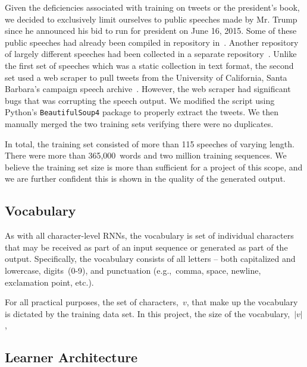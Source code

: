 \documentclass{article}
\begin{document}
Given the deficiencies associated with training on tweets or the president's book, we decided to exclusively limit ourselves to public speeches made by Mr. Trump since he announced his bid to run for president on June 16, 2015.  Some of these public speeches had already been compiled in repository in~\cite{ryanMcdermottTrumpSpeeches}.  Another repository of largely different speeches had been collected in a separate repository~\cite{pedramNavidTrumpSpeeches}.  Unlike the first set of speeches which was a static collection in text format, the second set used a web scraper to pull tweets from the University of California, Santa Barbara's campaign speech archive~\cite{americanPresidencyProject}.  However, the web scraper had significant bugs that was corrupting the speech output.  We modified the script using Python's \texttt{BeautifulSoup4} package to properly extract the tweets.  We then manually merged the two training sets verifying there were no duplicates.

In total, the training set consisted of more than 115 speeches of varying length.  There were more than 365,000~words and two million training sequences.  We believe the training set size is more than sufficient for a project of this scope, and we are further confident this is shown in the quality of the generated output.

\subsection{Vocabulary}

As with all character-level RNNs, the vocabulary is set of individual characters that may be received as part of an input sequence or generated as part of the output.  Specifically, the vocabulary consists of all letters -- both capitalized and lowercase, digits~(0-9), and punctuation (e.g.,~comma, space, newline, exclamation point, etc.).

For all practical purposes, the set of characters,~$v$, that make up the vocabulary is dictated by the training data set.  In this project, the size of the vocabulary,~$|v|$,

\subsection{Learner Architecture}
\end{document}
